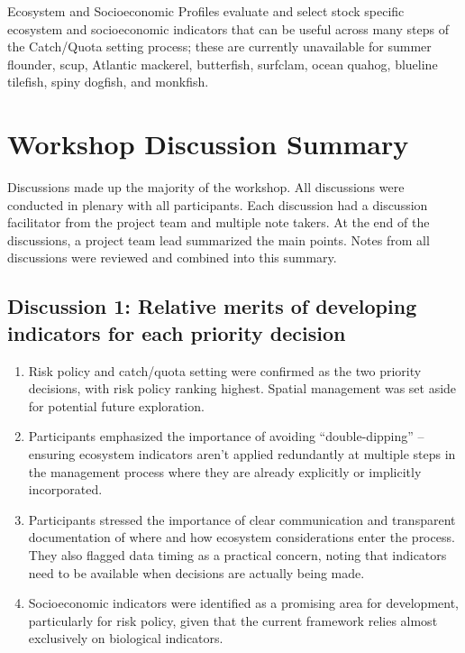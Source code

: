 \documentclass[
]{article}
\providecommand{\tightlist}{%
  \setlength{\itemsep}{0pt}\setlength{\parskip}{0pt}}
\begin{document}
Ecosystem and Socioeconomic Profiles evaluate and select stock specific ecosystem and socioeconomic indicators that can be useful across many steps of the Catch/Quota setting process; these are currently unavailable for summer flounder, scup, Atlantic mackerel, butterfish, surfclam, ocean quahog, blueline tilefish, spiny dogfish, and monkfish.

\section{Workshop Discussion Summary}\label{workshop-discussion-summary}

Discussions made up the majority of the workshop. All discussions were conducted in plenary with all participants. Each discussion had a discussion facilitator from the project team and multiple note takers. At the end of the discussions, a project team lead summarized the main points. Notes from all discussions were reviewed and combined into this summary.

\subsection{Discussion 1: Relative merits of developing indicators for each priority decision}\label{discussion-1-relative-merits-of-developing-indicators-for-each-priority-decision}

\begin{enumerate}
\def\labelenumi{\arabic{enumi}.}
\tightlist
\item
  Risk policy and catch/quota setting were confirmed as the two priority decisions, with risk policy ranking highest. Spatial management was set aside for potential future exploration.\\
\item
  Participants emphasized the importance of avoiding ``double-dipping'' -- ensuring ecosystem indicators aren't applied redundantly at multiple steps in the management process where they are already explicitly or implicitly incorporated.\\
\item
  Participants stressed the importance of clear communication and transparent documentation of where and how ecosystem considerations enter the process. They also flagged data timing as a practical concern, noting that indicators need to be available when decisions are actually being made.\\
\item
  Socioeconomic indicators were identified as a promising area for development, particularly for risk policy, given that the current framework relies almost exclusively on biological indicators.
\end{enumerate}
\end{document}
